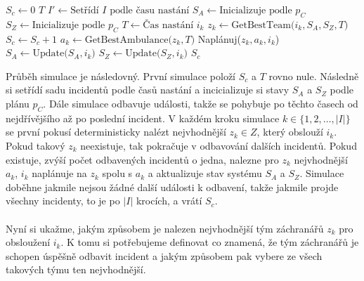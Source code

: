 \begin{algorithm}
  \begin{algorithmic}[1]  %
    \State $S_c \gets 0$
    \State $T$ 
    \State $I' \gets \mbox{Setřídí $I$ podle času nastání}$
    \State $S_A \gets \mbox{Inicializuje podle $p_C$}$
    \State $S_Z \gets \mbox{Inicializuje podle $p_C$}$
      \State $T \gets \mbox{Čas nastání $i_k$}$
      \State $z_k \gets \mbox{GetBestTeam($i_k, S_A, S_Z, T$)}$
        \State $S_c \gets S_c + 1$
        \State $a_k \gets \mbox{GetBestAmbulance($z_k, T$)}$
        \State Naplánuj($z_k, a_k, i_k$)
        \State $S_A \gets \mbox{Update($S_A, i_k$)}$
        \State $S_Z \gets \mbox{Update($S_Z, i_k$)}$
      \EndIf
    \EndFor
    \State \Return $S_c$
  \EndFunction
  \end{algorithmic}
\end{algorithm}
\vspace*{25px}

Průběh simulace je následovný. 
První simulace položí $S_c$ a $T$ rovno nule.
Následně si setřídí sadu incidentů podle časů nastání a incicializuje si stavy $S_A$ a $S_Z$ podle plánu $p_C$.
Dále simulace odbavuje události, takže se pohybuje po těchto časech od nejdřívějšího až po poslední incident.
V každém kroku simulace $k \in \{ 1, 2, \dots , |I|\}$ se první pokusí deterministicky nalézt nejvhodnější $z_k \in Z$, který obslouží $i_k$. 
Pokud takový $z_k$ neexistuje, tak pokračuje v odbavování dalších incidentů.
Pokud existuje, zvýší počet odbavených incidentů o jedna, nalezne pro $z_k$ nejvhodnější $a_k$, $i_k$ naplánuje na $z_k$ spolu s $a_k$ a aktualizuje stav systému $S_A$ a $S_Z$.
Simulace doběhne jakmile nejsou žádné další události k odbavení, takže jakmile projde všechny incidenty, to je po $|I|$ krocích, a vrátí $S_c$.
\\
\\
Nyní si ukažme, jakým způsobem je nalezen nejvhodnější tým záchranářů $z_k$ pro obsloužení $i_k$. K tomu si potřebujeme definovat co znamená,
že tým záchranářů je schopen úspěšně odbavit incident a jakým způsobem pak vybere ze všech takových týmu ten nejvhodnější.

\clearpage

